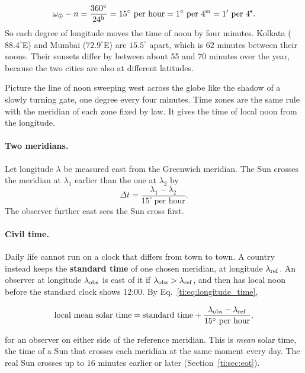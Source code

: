 \[
\omega_\oplus-n=\frac{360^\circ}{24^{\rm h}}=15^\circ\ \text{per hour}=1^\circ\ \text{per}\ 4^{\rm m}=1'\ \text{per}\ 4^{\rm s}.
\]
So each degree of longitude moves the time of noon by four minutes. Kolkata ($88.4^\circ$E) and Mumbai ($72.9^\circ$E) are $15.5^\circ$ apart, which is $62$ minutes between their noons. Their sunsets differ by between about 55 and 70 minutes over the year, because the two cities are also at different latitudes.

Picture the line of noon sweeping west across the globe like the shadow of a slowly turning gate, one degree every four minutes. Time zones are the same rule with the meridian of each zone fixed by law. It gives the time of local noon from the longitude.

\paragraph{Two meridians.} Let longitude $\lambda$ be measured east from the Greenwich meridian. The Sun crosses the meridian at $\lambda_1$ earlier than the one at $\lambda_2$ by
\begin{equation}
	\Delta t=\frac{\lambda_1-\lambda_2}{15^\circ\ \text{per hour}}.
	\label{ti:eq:longitude_time}
\end{equation}
The observer further east sees the Sun cross first.

\paragraph{Civil time.} Daily life cannot run on a clock that differs from town to town. A country instead keeps the \textbf{standard time} of one chosen meridian, at longitude $\lambda_{\rm ref}$. An observer at longitude $\lambda_{\rm obs}$ is east of it if $\lambda_{\rm obs}>\lambda_{\rm ref}$, and then has local noon before the standard clock shows 12:00. By Eq.~\eqref{ti:eq:longitude_time},
\begin{keyresult}
	\begin{equation}
		\text{local mean solar time} = \text{standard time} + \frac{\lambda_{\rm obs} - \lambda_{\rm ref}}{15^\circ\ \text{per hour}},
		\label{eq:civil_to_solar_time}
	\end{equation}
\end{keyresult}
for an observer on either side of the reference meridian. This is \emph{mean} solar time, the time of a Sun that crosses each meridian at the same moment every day. The real Sun crosses up to $16$ minutes earlier or later (Section~\ref{ti:sec:eot}).

